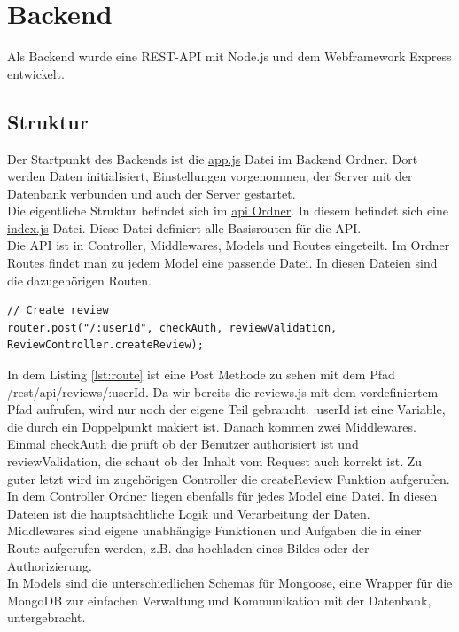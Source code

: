 \chapter{Backend}\label{ch:backend}
Als Backend wurde eine REST-API mit Node.js und dem Webframework Express entwickelt.

\section{Struktur}
Der Startpunkt des Backends ist die \hyperlink{https://github.com/Drinkler/Online-Shop/blob/master/backend/app.js}{app.js} Datei im Backend Ordner. Dort werden Daten initialisiert, Einstellungen vorgenommen, der Server mit der Datenbank verbunden und auch der Server gestartet.\\
Die eigentliche Struktur befindet sich im \hyperlink{https://github.com/Drinkler/Online-Shop/blob/master/backend/api}{api Ordner}. In diesem befindet sich eine \hyperlink{https://github.com/Drinkler/Online-Shop/blob/master/backend/api/index.js}{index.js} Datei. Diese Datei definiert alle Basisrouten für die API.\\
Die API ist in Controller, Middlewares, Models und Routes eingeteilt.
Im Ordner Routes findet man zu jedem Model eine passende Datei. In diesen Dateien sind die dazugehörigen Routen.

\begin{lstlisting}[caption={Route von Create review (backend > api > routes > reviews.js)},label={lst:route}]
// Create review
router.post("/:userId", checkAuth, reviewValidation, ReviewController.createReview);
\end{lstlisting}

In dem Listing \ref{lst:route} ist eine Post Methode zu sehen mit dem Pfad /rest/api/reviews/:userId. Da wir bereits die reviews.js mit dem vordefiniertem Pfad aufrufen, wird nur noch der eigene Teil gebraucht. :userId ist eine Variable, die durch ein Doppelpunkt makiert ist. Danach kommen zwei Middlewares. Einmal checkAuth die prüft ob der Benutzer authorisiert ist und reviewValidation, die schaut ob der Inhalt vom Request auch korrekt ist. Zu guter letzt wird im zugehörigen Controller die createReview Funktion aufgerufen.\\
In dem Controller Ordner liegen ebenfalls für jedes Model eine Datei. In diesen Dateien ist die hauptsächtliche Logik und Verarbeitung der Daten.\\
Middlewares sind eigene unabhängige Funktionen und Aufgaben die in einer Route aufgerufen werden, z.B. das hochladen eines Bildes oder der Authorizierung.\\
In Models sind die unterschiedlichen Schemas für Mongoose, eine Wrapper für die MongoDB zur einfachen Verwaltung und Kommunikation mit der Datenbank, untergebracht.

